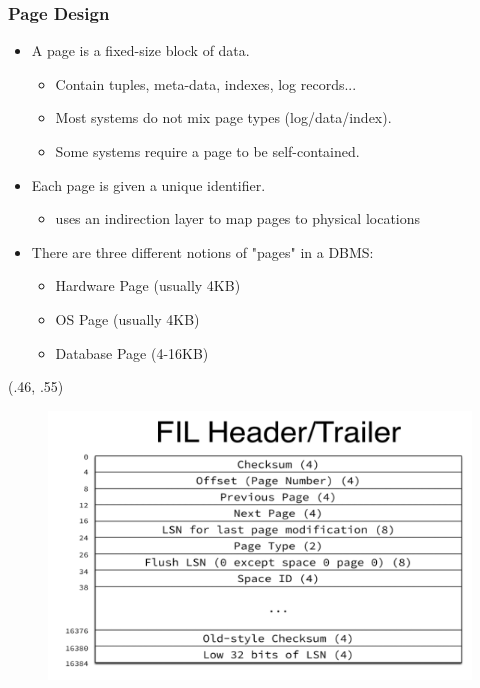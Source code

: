 \begin{frame}[fragile]
	\frametitle{Page Design}
	\begin{itemize}
		\item A page is a fixed-size block of data.
		\begin{itemize}
			\item Contain tuples, meta-data, indexes, log records...
			\item Most systems do not mix page types (log/data/index).
			\item Some systems require a page to be self-contained.
		\end{itemize}
		\item Each page is given a unique identifier.
		\begin{itemize}
			\item uses an indirection layer to map pages to physical locations
		\end{itemize}
		\item There are three different notions of "pages" in a DBMS:
		\begin{itemize}
			\item Hardware Page (usually 4KB)
			\item OS Page (usually 4KB)
			\item Database Page (4-16KB)
		\end{itemize}
	\end{itemize}
	\begin{textblock*}{.75\paperwidth}(.46\paperwidth, .55\paperheight) %
		\begin{figure}
			\includegraphics[width=.4\linewidth]{figs/dbfile-fil.png}
		\end{figure}
	\end{textblock*}

\end{frame}


